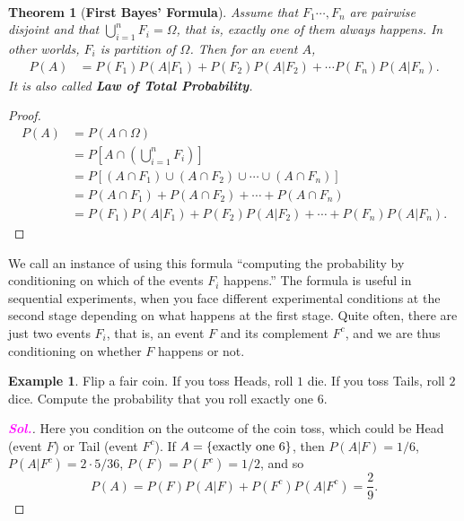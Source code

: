 \documentclass[12pt,a4paper]{article}
\newtheorem{theorem}{Theorem}[section]
\theoremstyle{definition}
\newtheorem{example}{Example}[section]
\theoremstyle{definition}
\theoremstyle{definition}
\theoremstyle{definition}
\theoremstyle{remark}
\theoremstyle{definition}
\newcommand{\sol}{\textcolor{magenta}{\bf \textit{Sol.}}\quad}
\begin{document}
\
\begin{tcolorbox}[colback=white]
	\begin{theorem}[\bf First Bayes' Formula]
		Assume that $F_1\cdots, F_n$ are pairwise disjoint and that $\bigcup_{i=1}^nF_i=\Omega$, that is, exactly one of them always happens. In other worlds, $F_i$ is partition of $\Omega$. Then for an event $A$, 
		\begin{align*}
		P(A)&=P(F_1)P(A|F_1)+P(F_2)P(A|F_2)+\cdots P(F_n)P(A|F_n).
		\end{align*} It is also called \textbf{Law of Total Probability}.
	\end{theorem}\tcblower\begin{proof}
	\begin{align*}
	P(A)&=P(A\cap\Omega)\\
	&=P\left[A\cap\left(\bigcup_{i=1}^nF_i\right)\right]\\
	&=P\left[(A\cap F_1)\cup(A\cap F_2)\cup\cdots\cup(A\cap F_n)\right]\\
	&=P(A\cap F_1)+P(A\cap F_2)+\cdots+P(A\cap F_n)\\
	&=P(F_1)P(A|F_1)+P(F_2)P(A|F_2)+\cdots+P(F_n)P(A|F_n).
	\end{align*}
\end{proof}
\end{tcolorbox} We call an instance of using this formula ``computing the probability by conditioning on which of the events $F_i$ happens.'' The formula is useful in sequential experiments, when you face different experimental conditions at the second stage depending on what happens at the first stage. Quite often, there are just two events $F_i$, that is, an event $F$ and its complement $F^c$, and we are thus conditioning on whether $F$ happens or not.\
\\
\begin{example}
	Flip a fair coin. If you toss Heads, roll $1$ die. If you toss Tails, roll $2$ dice. Compute the probability that you roll exactly one $6$.\begin{proof}[\sol]
		Here you condition on the outcome of the coin toss, which could be Head (event $F$) or Tail (event $F^c$). If $A=\set{\text{exactly one}\ 6}$, then $P(A|F)=1/6$, $P(A|F^c)=2\cdot 5/{36}$, $P(F)=P(F^c)=1/2$, and so \[
		P(A)=P(F)P(A|F)+P(F^c)P(A|F^c)=\frac{2}{9}.
		\]
	\end{proof}
\end{example}
\
\end{document}
